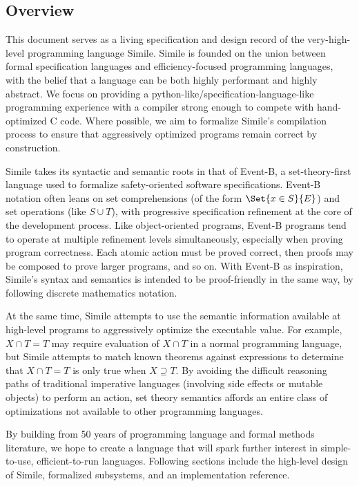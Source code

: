 \subsection{Overview}
This document serves as a living specification and design record of the very-high-level programming language Simile. Simile is founded on the union between formal specification languages and efficiency-focused programming languages, with the belief that a language can be both highly performant and highly abstract. We focus on providing a python-like/specification-language-like programming experience with a compiler strong enough to compete with hand-optimized C code. Where possible, we aim to formalize Simile's compilation process to ensure that aggressively optimized programs remain correct by construction.

Simile takes its syntactic and semantic roots in that of Event-B, a set-theory-first language used to formalize safety-oriented software specifications. Event-B notation often leans on set comprehensions (of the form $\Set{x \in S}{E}$) and set operations (like $S \cup T$), with progressive specification refinement at the core of the development process. Like object-oriented programs, Event-B programs tend to operate at multiple refinement levels simultaneously, especially when proving program correctness. Each atomic action must be proved correct, then proofs may be composed to prove larger programs, and so on. With Event-B as inspiration, Simile's syntax and semantics is intended to be proof-friendly in the same way, by following discrete mathematics notation.

At the same time, Simile attempts to use the semantic information available at high-level programs to aggressively optimize the executable value. For example, $X \cap T = T$ may require evaluation of $X \cap T$ in a normal programming language, but Simile attempts to match known theorems against expressions to determine that $X \cap T = T$ is only true when $X \supseteq T$. By avoiding the difficult reasoning paths of traditional imperative languages (involving side effects or mutable objects) to perform an action, set theory semantics affords an entire class of optimizations not available to other programming languages.

By building from 50 years of programming language and formal methods literature, we hope to create a language that will spark further interest in simple-to-use, efficient-to-run languages. Following sections include the high-level design of Simile, formalized subsystems, and an implementation reference.

